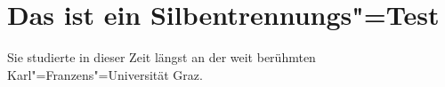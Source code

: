 \hypertarget{das-ist-ein-silbentrennungs-test}{%
\section{\texorpdfstring{Das ist ein
Silbentrennungs"=Test}{Das ist ein SilbentrennungsTest}}\label{das-ist-ein-silbentrennungs-test}}

Sie studierte in dieser Zeit längst an der weit berühmten
Karl"=Franzens"=Universität Graz.
